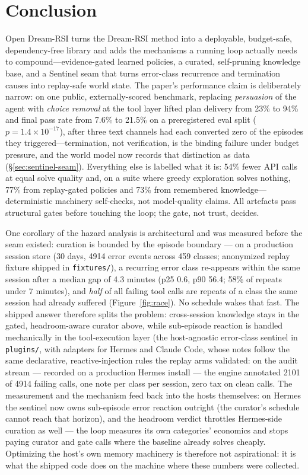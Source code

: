 \documentclass[11pt,a4paper]{article}
\begin{document}
\section{Conclusion}

Open Dream-RSI turns the Dream-RSI method into a deployable, budget-safe,
dependency-free library and adds the mechanisms a running loop actually
needs to compound---evidence-gated learned policies, a curated,
self-pruning knowledge base, and a Sentinel seam that turns error-class
recurrence and termination causes into replay-safe world state. The paper's
performance claim is deliberately narrow: on one public, externally-scored
benchmark, replacing \emph{persuasion} of the agent with \emph{choice
removal} at the tool layer lifted plan delivery from 23\% to 94\% and final
pass rate from 7.6\% to 21.5\% on a preregistered eval split
($p{=}1.4{\times}10^{-17}$), after three text channels had each converted
zero of the episodes they triggered---termination, not verification, is the
binding failure under budget pressure, and the world model now records that
distinction as data (\S\ref{sec:sentinel-seam}). Everything else is
labelled what it is: 54\% fewer API calls at equal solve quality and, on a
suite where greedy exploration solves nothing, 77\% from replay-gated
policies and 73\% from remembered knowledge---deterministic machinery
self-checks, not model-quality claims. All artefacts pass structural gates
before touching the loop; the gate, not trust, decides.

One corollary of the hazard analysis is architectural and was measured
before the seam existed: curation is bounded by the episode boundary ---
on a production session store (30 days, 4914 error events across 459
classes; anonymized replay fixture shipped in \texttt{fixtures/}), a
recurring error class re-appears within the same session after a median gap
of 4.3 minutes (p25 0.6, p90 56.4; 58\% of repeats under 7 minutes), and
\emph{half} of all failing tool calls are repeats of a class the same
session had already suffered (Figure~\ref{fig:race}). No schedule wakes
that fast. The shipped answer therefore splits
the problem: cross-session knowledge stays in the gated, headroom-aware
curator above, while sub-episode reaction is handled mechanically in the
tool-execution layer (the host-agnostic error-class sentinel in
\texttt{plugins/}, with adapters for Hermes and Claude Code, whose notes
follow the same declarative, reactive-injection rules the replay arms
validated: on the audit stream --- recorded on a production Hermes install
--- the engine annotated 2101 of 4914 failing calls, one note per class per
session, zero tax on clean calls. The measurement and the mechanism feed
back into the hosts themselves: on Hermes the sentinel now owns sub-episode
error reaction outright (the curator's schedule cannot reach that horizon),
and the headroom verdict throttles Hermes-side curation as well --- the
loop measures its own categories' economics and stops paying curator and
gate calls where the baseline already solves cheaply. Optimizing the host's
own memory machinery is therefore not aspirational: it is what the shipped
code does on the machine where these numbers were collected.
\end{document}
